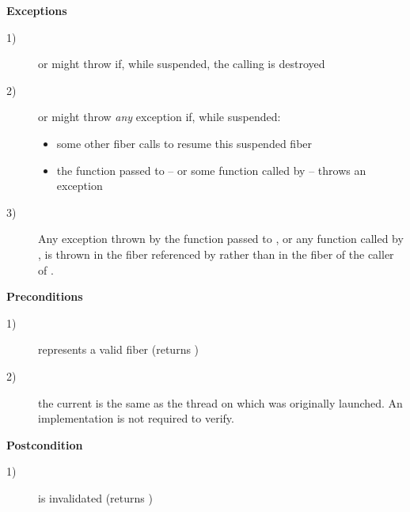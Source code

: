 {\bfseries Exceptions}
\begin{description}
    \item[1)] \resume or \resumewith might throw \unwindex if, while suspended,
              the calling \fiber is destroyed
    \item[2)] \resume or \resumewith might throw \emph{any} exception if,
              while suspended:
              \begin{itemize}
                  \item some other fiber calls \resumewith to resume this
                        suspended fiber
                  \item the function  passed to \resumewith -- or some
                        function called by  -- throws an exception
              \end{itemize}
    \item[3)] Any exception thrown by the function  passed to
              \resumewith, or any function called by , is thrown in the
              fiber referenced by  rather than in the fiber of
              the caller of \resumewith.
\end{description}

{\bfseries Preconditions}
\begin{description}
    \item[1)]  represents a valid fiber (\opbool returns )
    \item[2)] the current \thread is the same as the thread on which
               was originally launched. An implementation is not
              required to verify.
\end{description}

{\bfseries Postcondition}
\begin{description}
    \item[1)]  is invalidated (\opbool returns )
\end{description}

